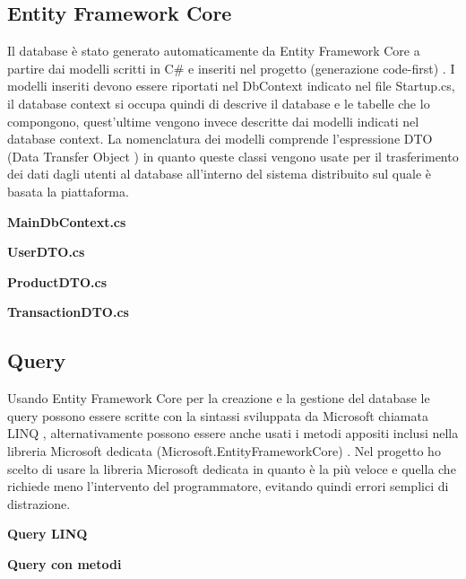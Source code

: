 \subsection{Entity Framework Core}
Il database è stato generato automaticamente da Entity Framework Core a partire dai modelli scritti in C\# e inseriti nel progetto (generazione code-first) \cite{EFcore}. I modelli inseriti devono essere riportati nel DbContext indicato nel file Startup.cs, il database context si occupa quindi di descrive il database e le tabelle che lo compongono, quest'ultime vengono invece descritte dai modelli indicati nel database context. La nomenclatura dei modelli comprende l'espressione DTO (Data Transfer Object \cite{DTO}) in quanto queste classi vengono usate per il trasferimento dei dati dagli utenti al database all'interno del sistema distribuito sul quale è basata la piattaforma. 
\bigskip

\textbf{MainDbContext.cs}

\bigskip

\textbf{UserDTO.cs}

\bigskip

\textbf{ProductDTO.cs}

\bigskip

\textbf{TransactionDTO.cs}


\subsection{Query}
Usando Entity Framework Core per la creazione e la gestione del database le query possono essere scritte con la sintassi sviluppata da Microsoft chiamata LINQ \cite{LINQ}, alternativamente possono essere anche usati i metodi appositi inclusi nella libreria Microsoft dedicata (Microsoft.EntityFrameworkCore) \cite{Microsoft.EFcore}. Nel progetto ho scelto di usare la libreria Microsoft dedicata in quanto è la più veloce e quella che richiede meno l'intervento del programmatore, evitando quindi errori semplici di distrazione. 
\bigskip

\textbf{Query LINQ}

\bigskip

\textbf{Query con metodi}
